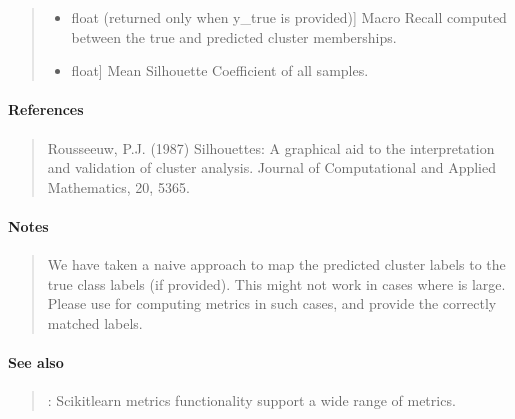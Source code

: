\documentclass[letterpaper,10pt,english,openany,oneside]{sphinxmanual}
\begin{document}
\begin{fulllineitems}
\begin{quote}
\begin{description}
\begin{itemize}
\begin{description}
\end{description}

\item {} \begin{description}
\sphinxlineitem{Macro Recall}{[}float (returned only when y\_true is provided){]}
\sphinxAtStartPar
Macro Recall computed between the true and predicted cluster memberships.

\end{description}

\item {} \begin{description}
\sphinxlineitem{Average Silhouette Score}{[}float{]}
\sphinxAtStartPar
Mean Silhouette Coefficient of all samples.

\end{description}

\end{itemize}

\end{description}
\end{quote}


\paragraph{References}
\label{\detokenize{api_reference/generated/QuadratiK.spherical_clustering.PKBC:id5}}\begin{quote}

\sphinxAtStartPar
Rousseeuw, P.J. (1987) Silhouettes: A graphical aid to the interpretation and validation of cluster analysis. 
Journal of Computational and Applied Mathematics, 20, 53\textendash{}65.
\end{quote}


\paragraph{Notes}
\label{\detokenize{api_reference/generated/QuadratiK.spherical_clustering.PKBC:notes}}\begin{quote}

\sphinxAtStartPar
We have taken a naive approach to map the predicted cluster labels 
to the true class labels (if provided). This might not work in cases where  is large.
Please use  for computing metrics in such cases, and provide the correctly
matched labels.
\end{quote}


\paragraph{See also}
\label{\detokenize{api_reference/generated/QuadratiK.spherical_clustering.PKBC:see-also}}\begin{quote}

\sphinxAtStartPar
{} : Scikit\sphinxhyphen{}learn metrics functionality support a wide range of metrics.
\end{quote}

\end{fulllineitems}
\end{document}
